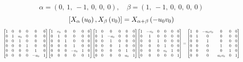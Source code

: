 \documentclass[11pt]{article}
\theoremstyle{definition}
\begin{document}
\[
\alpha = \left( 0, \  1, \  -1, \  0, \  0, \  0\right), \quad \beta = \left( 1, \  -1, \  0, \  0, \  0, \  0\right)
\]
\[
\scaletoalign{\textwidth}{\left[ X_{\alpha}\left(u_{0}\right), X_{\beta}\left(v_{0}\right) \right] = X_{\alpha + \beta}\left(- u_{0} v_{0}\right)}
\]
\[
\scaletoalign{\textwidth}{{\left[\begin{matrix}1 & 0 & 0 & 0 & 0 & 0\\0 & 1 & u_{0} & 0 & 0 & 0\\0 & 0 & 1 & 0 & 0 & 0\\0 & 0 & 0 & 1 & 0 & 0\\0 & 0 & 0 & 0 & 1 & 0\\0 & 0 & 0 & 0 & - u_{0} & 1\end{matrix}\right]} {\left[\begin{matrix}1 & v_{0} & 0 & 0 & 0 & 0\\0 & 1 & 0 & 0 & 0 & 0\\0 & 0 & 1 & 0 & 0 & 0\\0 & 0 & 0 & 1 & 0 & 0\\0 & 0 & 0 & - v_{0} & 1 & 0\\0 & 0 & 0 & 0 & 0 & 1\end{matrix}\right]} {\left[\begin{matrix}1 & 0 & 0 & 0 & 0 & 0\\0 & 1 & - u_{0} & 0 & 0 & 0\\0 & 0 & 1 & 0 & 0 & 0\\0 & 0 & 0 & 1 & 0 & 0\\0 & 0 & 0 & 0 & 1 & 0\\0 & 0 & 0 & 0 & u_{0} & 1\end{matrix}\right]} {\left[\begin{matrix}1 & - v_{0} & 0 & 0 & 0 & 0\\0 & 1 & 0 & 0 & 0 & 0\\0 & 0 & 1 & 0 & 0 & 0\\0 & 0 & 0 & 1 & 0 & 0\\0 & 0 & 0 & v_{0} & 1 & 0\\0 & 0 & 0 & 0 & 0 & 1\end{matrix}\right]} = {\left[\begin{matrix}1 & 0 & - u_{0} v_{0} & 0 & 0 & 0\\0 & 1 & 0 & 0 & 0 & 0\\0 & 0 & 1 & 0 & 0 & 0\\0 & 0 & 0 & 1 & 0 & 0\\0 & 0 & 0 & 0 & 1 & 0\\0 & 0 & 0 & u_{0} v_{0} & 0 & 1\end{matrix}\right]}}
\]
\end{document}
